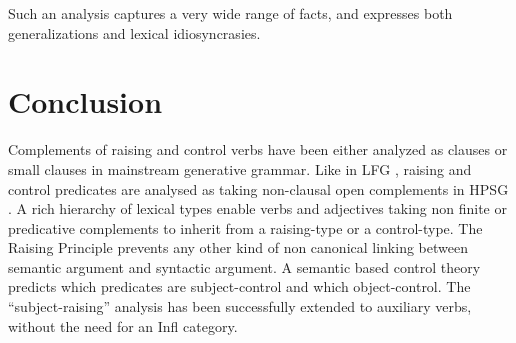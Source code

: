 \documentclass[output=paper]{langsci/langscibook}
\begin{document}
Such an analysis captures a very wide range of facts, and expresses both generalizations and lexical idiosyncrasies.


	
\section{Conclusion}
Complements of raising and control verbs have been either analyzed as clauses \citep{Chomsky1981} or small clauses \citep{Stowell1981,Stowell1983} in mainstream generative grammar.
Like in LFG \citet{Bresnan1982}, raising and control predicates are analysed as taking non-clausal open complements in HPSG \citet{PollardandSag1994}. A rich hierarchy of lexical types enable verbs and adjectives taking non finite or predicative complements to inherit from a raising-type or a control-type. The Raising Principle prevents any other kind of non canonical linking between semantic argument and syntactic argument. A semantic based control theory predicts which predicates are subject-control and which object-control. The ``subject-raising'' analysis has been successfully extended to auxiliary verbs, without the need for an Infl category.





\printbibliography[heading=subbibliography,notkeyword=this] 
\end{document}
